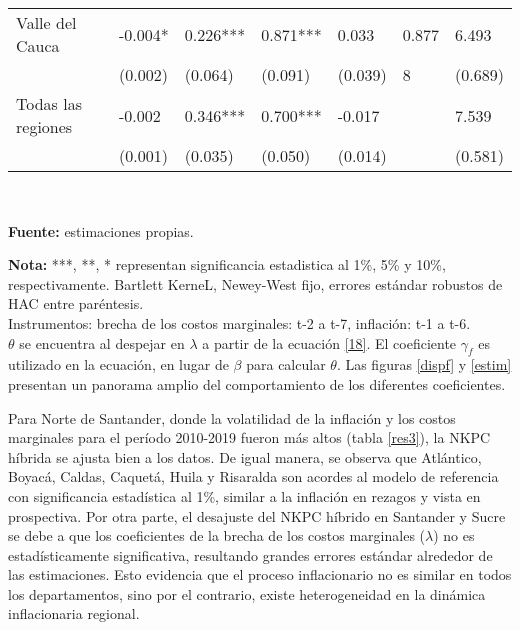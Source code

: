 \begin{table}[H]
\centering
\begin{tabular}{lllllll}
\vspace{-0.3cm} Valle del Cauca& -0.004* & 0.226*** & 0.871*** & 0.033 & 0.877 & 6.493\\   
& \scriptsize{(0.002)} & \scriptsize{(0.064)} & \scriptsize{(0.091)} & \scriptsize{(0.039)} & \scriptsize{8}     & \scriptsize{(0.689)} \\
\vspace{-0.3cm} Todas las regiones & -0.002 & 0.346*** & 0.700*** & -0.017 &       & 7.539\\   
& \scriptsize{(0.001)} & \scriptsize{(0.035)} & \scriptsize{(0.050)} & \scriptsize{(0.014)} &       & \scriptsize{(0.581)} \\
\hline
\end{tabular}
\label{}\\
  \raggedright  \scriptsize \textbf{Fuente:} estimaciones propias.\\
\raggedright  \scriptsize \textbf{Nota:} ***,  **, * representan significancia estadistica al 1\%, 5\% y 10\%, respectivamente. Bartlett KerneL, Newey-West fijo, errores estándar robustos de HAC entre paréntesis.\\
Instrumentos: brecha de los costos marginales: t-2 a t-7, inflación: t-1 a t-6.\\
$\theta$ se encuentra al despejar en $\lambda$ a partir de la ecuación \eqref{18}. El coeficiente $\gamma_{f}$ es utilizado en la ecuación, en lugar de $\beta$ para calcular $\theta$. Las figuras \ref{dispf} y \ref{estim} presentan un panorama amplio del comportamiento de los diferentes coeficientes.
\end{table}%

Para Norte de Santander, donde la volatilidad de la inflación y los costos marginales para el período 2010-2019 fueron más altos (tabla \ref{res3}), la NKPC híbrida se ajusta bien a los datos. De igual manera,  se observa que Atlántico, Boyacá, Caldas, Caquetá, Huila y Risaralda son acordes al modelo de referencia con significancia estadística al 1\%, similar a la inflación en rezagos y vista en prospectiva. Por otra parte, el desajuste  del NKPC híbrido en Santander y Sucre  se debe a  que los coeficientes de la brecha de los costos marginales ($\lambda$) no es estadísticamente significativa, resultando grandes errores estándar alrededor de las estimaciones. Esto evidencia que el proceso inflacionario no es similar en todos los departamentos, sino por el contrario, existe heterogeneidad en la dinámica inflacionaria regional.\\

